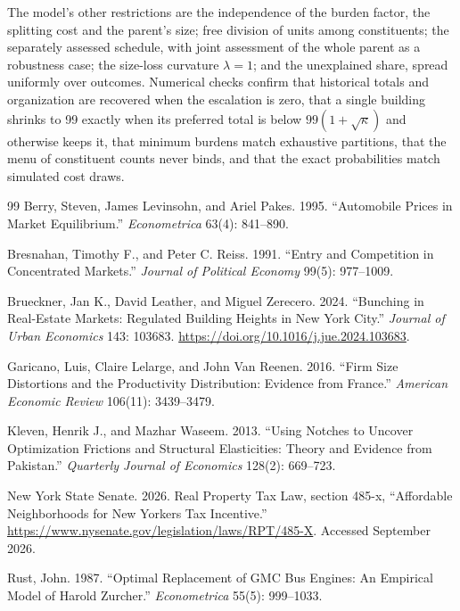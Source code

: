 \documentclass[11pt]{article}
\begin{document}
The model's other restrictions are the independence of the burden factor, the splitting cost and the parent's size; free division of units among constituents; the separately assessed schedule, with joint assessment of the whole parent as a robustness case; the size-loss curvature $\lambda=1$; and the unexplained share, spread uniformly over outcomes. Numerical checks confirm that historical totals and organization are recovered when the escalation is zero, that a single building shrinks to 99 exactly when its preferred total is below $99(1+\sqrt\kappa)$ and otherwise keeps it, that minimum burdens match exhaustive partitions, that the menu of constituent counts never binds, and that the exact probabilities match simulated cost draws.

\begin{thebibliography}{99}
Berry, Steven, James Levinsohn, and Ariel Pakes. 1995.
``Automobile Prices in Market Equilibrium.''
\emph{Econometrica} 63(4): 841--890.

Bresnahan, Timothy F., and Peter C. Reiss. 1991.
``Entry and Competition in Concentrated Markets.''
\emph{Journal of Political Economy} 99(5): 977--1009.

Brueckner, Jan K., David Leather, and Miguel Zerecero. 2024.
``Bunching in Real-Estate Markets: Regulated Building Heights in New York City.''
\emph{Journal of Urban Economics} 143: 103683.
\url{https://doi.org/10.1016/j.jue.2024.103683}.

Garicano, Luis, Claire Lelarge, and John Van Reenen. 2016.
``Firm Size Distortions and the Productivity Distribution: Evidence from France.''
\emph{American Economic Review} 106(11): 3439--3479.

Kleven, Henrik J., and Mazhar Waseem. 2013.
``Using Notches to Uncover Optimization Frictions and Structural Elasticities: Theory and Evidence from Pakistan.''
\emph{Quarterly Journal of Economics} 128(2): 669--723.

New York State Senate. 2026.
Real Property Tax Law, section 485-x, ``Affordable Neighborhoods for New Yorkers Tax Incentive.''
\url{https://www.nysenate.gov/legislation/laws/RPT/485-X}.
Accessed September 2026.

Rust, John. 1987.
``Optimal Replacement of GMC Bus Engines: An Empirical Model of Harold Zurcher.''
\emph{Econometrica} 55(5): 999--1033.
\end{thebibliography}
\end{document}
